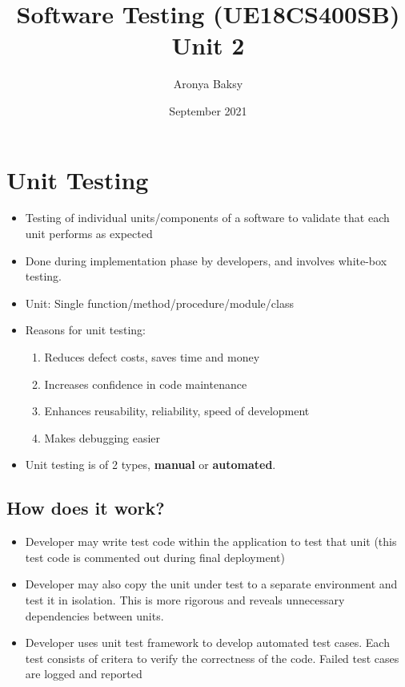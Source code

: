\documentclass{article}
\title{Software Testing (UE18CS400SB) \\ Unit 2}
\author{Aronya Baksy}
\date{September 2021}
\begin{document}
\maketitle

\section{Unit Testing}
\begin{itemize}
    \item Testing of individual units/components of a software to validate that each unit performs as expected
    
    \item Done during implementation phase by developers, and involves white-box testing.
    
    \item Unit: Single function/method/procedure/module/class
    
    \item Reasons for unit testing:
    \begin{enumerate}
        \item Reduces defect costs, saves time and money
        
        \item Increases confidence in code maintenance
        
        \item Enhances reusability, reliability, speed of development
        
        \item Makes debugging easier
    \end{enumerate}
    
    \item Unit testing is of 2 types, \textbf{manual} or \textbf{automated}. 
\end{itemize}
\subsection{How does it work?}
\begin{itemize}
    \item Developer may write test code within the application to test that unit (this test code is commented out during final deployment)
    
    \item Developer may also copy the unit under test to a separate environment and test it in isolation. This is more rigorous and reveals unnecessary dependencies between units.
    
    \item Developer uses unit test framework to develop automated test cases. Each test consists of critera to verify the correctness of the code. Failed test cases are logged and reported
\end{itemize}
\end{document}
